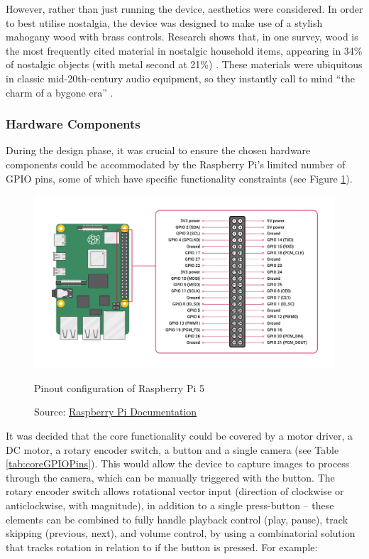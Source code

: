             However, rather than just running the device, aesthetics were considered. In order to best utilise nostalgia, the device was designed to make use of a stylish mahogany wood with brass controls. Research shows that, in one survey, wood is the most frequently cited material in nostalgic household items, appearing in 34\% of nostalgic objects (with metal second at 21\%) \cite{Skinner2022}. These materials were ubiquitous in classic mid-20th-century audio equipment, so they instantly call to mind ``the charm of a bygone era'' \cite{LookInTheAttic2024}.
    
            \subsubsection{Hardware Components}
    
                During the design phase, it was crucial to ensure the chosen hardware components could be accommodated by the Raspberry Pi's limited number of GPIO pins, some of which have specific functionality constraints (see Figure \ref{fig:RPi5Pinout}).
    
                \begin{figure}[htbp]
                    \centering
                    \includegraphics[width=\linewidth]{images/raspberry-pi-5-pinout.png}
                    \caption{Pinout configuration of Raspberry Pi 5}
                    \label{fig:RPi5Pinout}
                    \caption*{Source: \href{https://www.raspberrypi.com/documentation/computers/raspberry-pi.html#gpio}{Raspberry Pi Documentation}}
                \end{figure}
    
                It was decided that the core functionality could be covered by a motor driver, a DC motor, a rotary encoder switch, a button and a single camera (see Table \ref{tab:coreGPIOPins}). This would allow the device to capture images to process through the camera, which can be manually triggered with the button. The rotary encoder switch allows rotational vector input (direction of clockwise or anticlockwise, with magnitude), in addition to a single press-button -- these elements can be combined to fully handle playback control (play, pause), track skipping (previous, next), and volume control, by using a combinatorial solution that tracks rotation in relation to if the button is pressed. For example:
    
